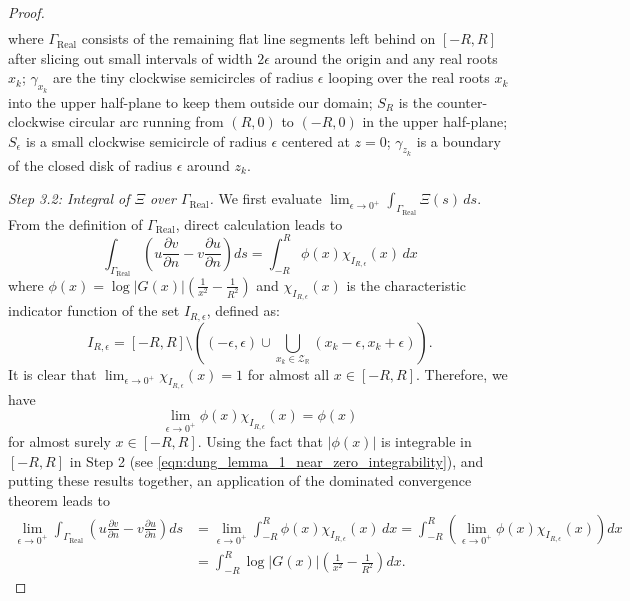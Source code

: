 \documentclass[11pt,twoside]{article} %
\begin{document}
\begin{proof}
\begin{align}
\end{align}
where $\Gamma_{\text{Real}}$ consists of the remaining flat line segments left behind on $[-R, R]$ after slicing out small intervals of width $2\epsilon$ around the origin and any real roots $x_k$; $\gamma_{x_k}$ are the tiny clockwise semicircles of radius $\epsilon$ looping over the real roots $x_k$ into the upper half-plane to keep them outside our domain; $S_R$ is the counter-clockwise circular arc running from $(R, 0)$ to $(-R, 0)$ in the upper half-plane; $S_\epsilon$ is a small clockwise semicircle of radius $\epsilon$ centered at $z = 0$; $\gamma_{z_k}$ is a boundary of the closed disk of radius $\epsilon$ around $z_{k}$.

\textit{Step 3.2: Integral of $\Xi$ over $\Gamma_{\text{Real}}$. } We first evaluate $\lim_{\epsilon \to 0^+} \int_{\Gamma_{\text{Real}}} \Xi(s)\,ds$. From the definition of $\Gamma_{\text{Real}}$, direct calculation leads to
$$\int_{\Gamma_{\text{Real}}} \left( u \frac{\partial v}{\partial n} - v \frac{\partial u}{\partial n} \right) ds = \int_{-R}^R \phi(x) \chi_{I_{R,\epsilon}}(x) \, dx$$
where $\phi(x) = \log|G(x)| \left( \frac{1}{x^2} - \frac{1}{R^2} \right)$ and $\chi_{I_{R,\epsilon}}(x)$ is the characteristic indicator function of the set $I_{R,\epsilon}$, defined as:$$ I_{R,\epsilon} = [-R, R] \setminus \left( (-\epsilon, \epsilon) \cup \bigcup_{x_k \in \mathcal{Z}_{\mathbb{R}}} (x_k - \epsilon, x_k + \epsilon) \right).$$
It is clear that $\lim_{\epsilon \to 0^+} \chi_{I_{R,\epsilon}}(x) = 1$ for almost all $x \in [-R, R]$. Therefore, we have
\begin{equation*}
    \lim_{\epsilon \to 0^+} \phi(x) \chi_{I_{R,\epsilon}}(x) = \phi(x)
\end{equation*}
for almost surely $x \in [-R, R]$. Using the fact that $|\phi(x)|$ is integrable in $[-R,R]$ in Step 2 (see \eqref{eqn:dung_lemma_1_near_zero_integrability}), and putting these results together, an application of the dominated convergence theorem leads to
\begin{align}
\lim_{\epsilon \to 0^+} \int_{\Gamma_{\text{Real}}} \left( u \frac{\partial v}{\partial n} - v \frac{\partial u}{\partial n} \right) ds & = \lim_{\epsilon \to 0^+} \int_{-R}^R\phi(x) \chi_{I_{R,\epsilon}}(x) \, dx = \int_{-R}^R \left( \lim_{\epsilon \to 0^+} \phi(x) \chi_{I_{R,\epsilon}}(x) \right) dx \nonumber \\
& = \int_{-R}^R \log|G(x)| \left( \frac{1}{x^2} - \frac{1}{R^2} \right) dx. \label{eq:logarithmic_bound_2}
\end{align}


\end{proof}
\end{document}
